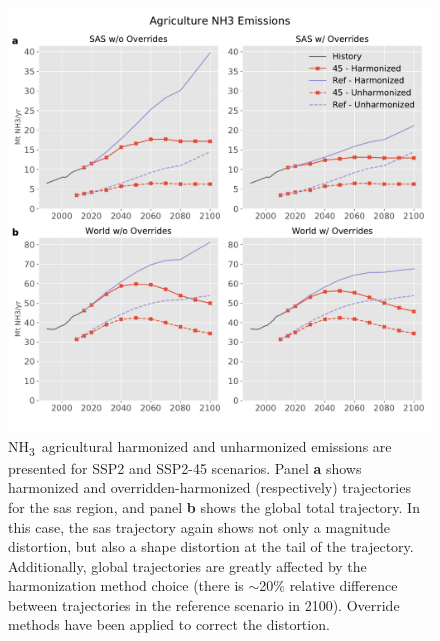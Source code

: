 \documentclass[review]{elsarticle}
\newcommand{\nhtt}{NH\textsubscript{3}~}
\begin{document}
\begin{figure}
  \begin{center}
    \includegraphics[width=\textwidth]{sep_regions_results_NH3_Agriculture.pdf}
    \caption[]{
      \label{fig:nh3}
      \nhtt agricultural harmonized and unharmonized emissions are presented for
      SSP2 and SSP2-45 scenarios. Panel \textbf{a} shows harmonized and
      overridden-harmonized (respectively) trajectories for the \gls{sas}
      region, and panel \textbf{b} shows the global total trajectory. In this
      case, the \gls{sas} trajectory again shows not only a magnitude distortion, but
      also a shape distortion at the tail of the trajectory. Additionally,
      global trajectories are greatly affected by the harmonization method
      choice (there is $\sim$20\% relative difference between trajectories in
      the reference scenario in 2100). Override methods have been applied to
      correct the distortion.  }
  \end{center}
\end{figure}
\end{document}
